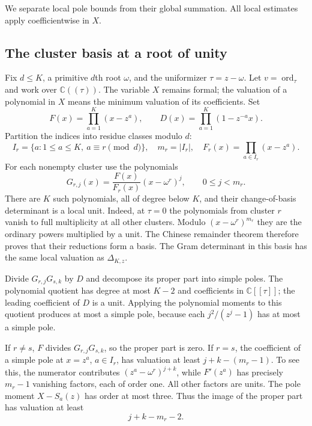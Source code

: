 \documentclass[11pt]{article}
\theoremstyle{remark}
\newcommand{\C}{\mathbb C}
\newcommand{\ord}{\operatorname{ord}}
\begin{document}
We separate local pole bounds from their global summation. All local
estimates apply coefficientwise in $X$.

\subsection{The cluster basis at a root of unity}

Fix $d\le K$, a primitive $d$th root $\omega$, and the uniformizer
$\tau=z-\omega$. Let $v=\ord_\tau$ and work over $\C((\tau))$.
The variable $X$ remains formal; the valuation of a polynomial in $X$
means the minimum valuation of its coefficients. Set
\[
 F(x)=\prod_{a=1}^K(x-z^a),\qquad
 D(x)=\prod_{a=1}^K(1-z^{-a}x).
\]
Partition the indices into residue classes modulo $d$:
\[
 I_r=\{a:1\le a\le K,\ a\equiv r\pmod d\},\quad
 m_r=|I_r|,\quad F_r(x)=\prod_{a\in I_r}(x-z^a).
\]
For each nonempty cluster use the polynomials
\begin{equation}\label{eq:cluster-basis}
 G_{r,j}(x)=\frac{F(x)}{F_r(x)}(x-\omega^r)^j,
 \qquad 0\le j<m_r.
\end{equation}
There are $K$ such polynomials, all of degree below $K$, and their
change-of-basis determinant is a local unit. Indeed, at $\tau=0$ the
polynomials from cluster $r$ vanish to full multiplicity at all other
clusters. Modulo $(x-\omega^r)^{m_r}$ they are the ordinary powers
multiplied by a unit. The Chinese remainder theorem therefore proves
that their reductions form a basis. The Gram determinant in this
basis has the same local valuation as $\Delta_{K,z}$.

Divide $G_{r,j}G_{s,k}$ by $D$ and decompose its proper part into
simple poles. The polynomial quotient has degree at most $K-2$ and
coefficients in $\C[[\tau]]$; the leading coefficient of $D$ is a unit.
Applying the polynomial moments to this quotient produces at most a
simple pole, because each $j^2/(z^j-1)$ has at most a simple pole.

If $r\ne s$, $F$ divides $G_{r,j}G_{s,k}$, so the proper part is zero.
If $r=s$, the coefficient of a simple pole at $x=z^a$, $a\in I_r$,
has valuation at least
$j+k-(m_r-1)$. To see this, the numerator contributes
$(z^a-\omega^r)^{j+k}$, while $F'(z^a)$ has precisely $m_r-1$
vanishing factors, each of order one. All other factors are units.
The pole moment $X-S_a(z)$ has order at most three. Thus the image of
the proper part has valuation at least
\begin{equation}\label{eq:pole-local}
 j+k-m_r-2.
\end{equation}
\end{document}
